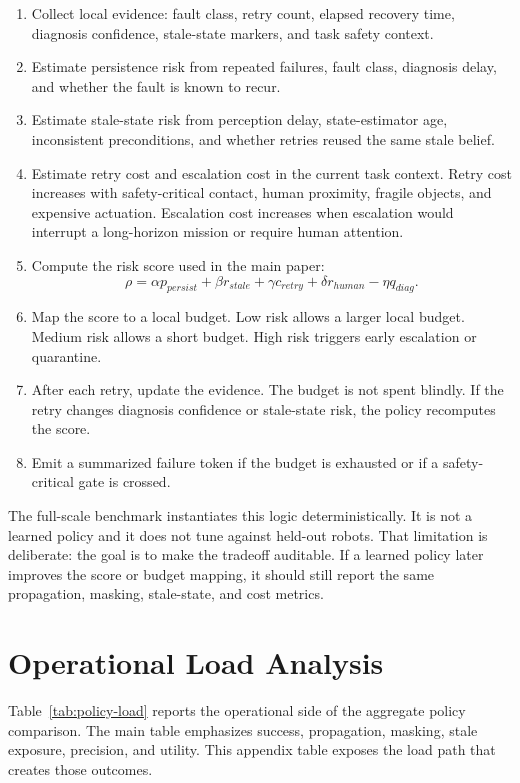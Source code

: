 \begin{enumerate}[leftmargin=*]
\item Collect local evidence: fault class, retry count, elapsed recovery time, diagnosis confidence, stale-state markers, and task safety context.
\item Estimate persistence risk from repeated failures, fault class, diagnosis delay, and whether the fault is known to recur.
\item Estimate stale-state risk from perception delay, state-estimator age, inconsistent preconditions, and whether retries reused the same stale belief.
\item Estimate retry cost and escalation cost in the current task context. Retry cost increases with safety-critical contact, human proximity, fragile objects, and expensive actuation. Escalation cost increases when escalation would interrupt a long-horizon mission or require human attention.
\item Compute the risk score used in the main paper:
\[
\rho = \alpha p_{persist} + \beta r_{stale} + \gamma c_{retry} + \delta r_{human} - \eta q_{diag}.
\]
\item Map the score to a local budget. Low risk allows a larger local budget. Medium risk allows a short budget. High risk triggers early escalation or quarantine.
\item After each retry, update the evidence. The budget is not spent blindly. If the retry changes diagnosis confidence or stale-state risk, the policy recomputes the score.
\item Emit a summarized failure token if the budget is exhausted or if a safety-critical gate is crossed.
\end{enumerate}

The full-scale benchmark instantiates this logic deterministically. It is not a learned policy and it does not tune against held-out robots. That limitation is deliberate: the goal is to make the tradeoff auditable. If a learned policy later improves the score or budget mapping, it should still report the same propagation, masking, stale-state, and cost metrics.

\section{Operational Load Analysis}

Table~\ref{tab:policy-load} reports the operational side of the aggregate policy comparison. The main table emphasizes success, propagation, masking, stale exposure, precision, and utility. This appendix table exposes the load path that creates those outcomes.

